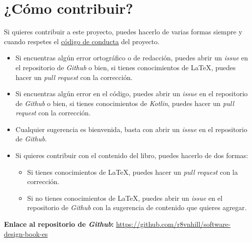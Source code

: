 \newpage
\section*{¿Cómo contribuir?}
  Si quieres contribuir a este proyecto, puedes hacerlo de varias formas siempre y cuando respetes
  el \href{https://github.com/r8vnhill/software-design-book-es/blob/master/CODE_OF_CONDUCT.md}{
    código de conducta}
  del proyecto.

  \begin{itemize}
    \item Si encuentras algún error ortográfico o de redacción, puedes abrir un \textit{issue} en el 
      repositorio de \textit{Github} o bien, si tienes conocimientos de \LaTeX, puedes hacer un 
      \textit{pull request} con la corrección.
    \item Si encuentras algún error en el código, puedes abrir un \textit{issue} en el repositorio 
      de \textit{Github} o bien, si tienes conocimientos de \textit{Kotlin}, puedes hacer un 
      \textit{pull request} con la corrección.
    \item Cualquier sugerencia es bienvenida, basta con abrir un \textit{issue} en el repositorio de 
      \textit{Github}.
    \item Si quieres contribuir con el contenido del libro, puedes hacerlo de dos formas:
    \begin{itemize}
      \item Si tienes conocimientos de \LaTeX, puedes hacer un \textit{pull request} con la 
        corrección.
      \item Si no tienes conocimientos de \LaTeX, puedes abrir un \textit{issue} en el repositorio
        de \textit{Github} con la sugerencia de contenido que quieres agregar.
    \end{itemize}
  \end{itemize}

  \textbf{Enlace al repositorio de \textit{Github}:} 
  \url{https://github.com/r8vnhill/software-design-book-es}